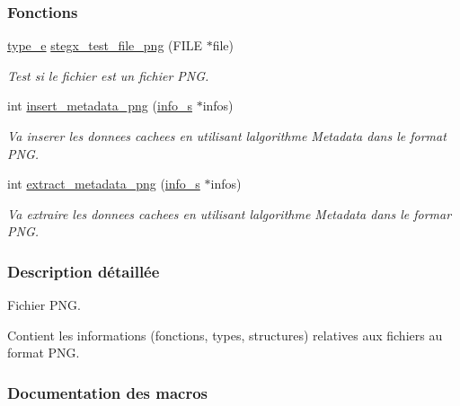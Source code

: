 \subsubsection*{Fonctions}
\begin{DoxyCompactItemize}
\item 
\hyperlink{a00047_af1ca434cca36ba9fb2a45f6cef3a16d6}{type\+\_\+e} \hyperlink{a00095_a576071ea25bd3721014ca3e596adcdfb}{stegx\+\_\+test\+\_\+file\+\_\+png} (F\+I\+LE $\ast$file)
\begin{DoxyCompactList}\small\item\em Test si le fichier est un fichier P\+NG. \end{DoxyCompactList}\item 
int \hyperlink{a00095_a2386f518ec5df78485cca31c6fe4f858}{insert\+\_\+metadata\+\_\+png} (\hyperlink{a00008_aa8ca908d92fb5bdd3c0a9e1f58b2cf03}{info\+\_\+s} $\ast$infos)
\begin{DoxyCompactList}\small\item\em Va inserer les donnees cachees en utilisant l\textquotesingle{}algorithme Metadata dans le format P\+NG. \end{DoxyCompactList}\item 
int \hyperlink{a00095_a258c2aefc0d29e112eca90e652730a84}{extract\+\_\+metadata\+\_\+png} (\hyperlink{a00008_aa8ca908d92fb5bdd3c0a9e1f58b2cf03}{info\+\_\+s} $\ast$infos)
\begin{DoxyCompactList}\small\item\em Va extraire les donnees cachees en utilisant l\textquotesingle{}algorithme Metadata dans le formar P\+NG. \end{DoxyCompactList}\end{DoxyCompactItemize}


\subsubsection{Description détaillée}
Fichier P\+NG. 

Contient les informations (fonctions, types, structures) relatives aux fichiers au format P\+NG. 

\subsubsection{Documentation des macros}
\mbox{\label{a00095_a38cdc6b069846fcd541e77b8f2e55d22}} 

